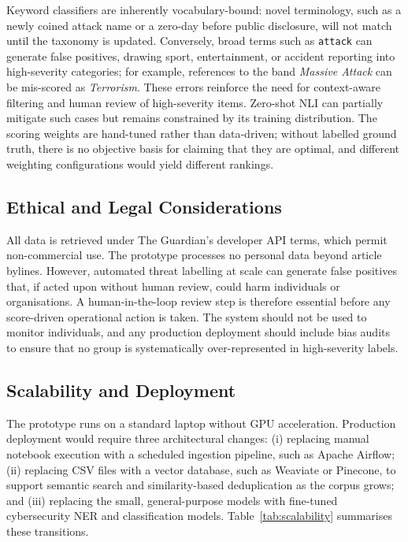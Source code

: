 \documentclass[12pt,lettersize,journal,onecolumn]{IEEEtran}
\begin{document}
Keyword classifiers are inherently vocabulary-bound: novel terminology, such as a newly coined attack name or a zero-day before public disclosure, will not match until the taxonomy is updated. Conversely, broad terms such as \texttt{attack} can generate false positives, drawing sport, entertainment, or accident reporting into high-severity categories; for example, references to the band \emph{Massive Attack} can be mis-scored as \emph{Terrorism}. These errors reinforce the need for context-aware filtering and human review of high-severity items. Zero-shot NLI can partially mitigate such cases but remains constrained by its training distribution. The scoring weights are hand-tuned rather than data-driven; without labelled ground truth, there is no objective basis for claiming that they are optimal, and different weighting configurations would yield different rankings.

\subsection{Ethical and Legal Considerations}

All data is retrieved under The Guardian's developer API terms, which permit non-commercial use. The prototype processes no personal data beyond article bylines. However, automated threat labelling at scale can generate false positives that, if acted upon without human review, could harm individuals or organisations. A human-in-the-loop review step is therefore essential before any score-driven operational action is taken. The system should not be used to monitor individuals, and any production deployment should include bias audits to ensure that no group is systematically over-represented in high-severity labels.

\subsection{Scalability and Deployment}

The prototype runs on a standard laptop without GPU acceleration. Production deployment would require three architectural changes: (i) replacing manual notebook execution with a scheduled ingestion pipeline, such as Apache Airflow; (ii) replacing CSV files with a vector database, such as Weaviate or Pinecone, to support semantic search and similarity-based deduplication as the corpus grows; and (iii) replacing the small, general-purpose models with fine-tuned cybersecurity NER and classification models. Table~\ref{tab:scalability} summarises these transitions.
\end{document}
